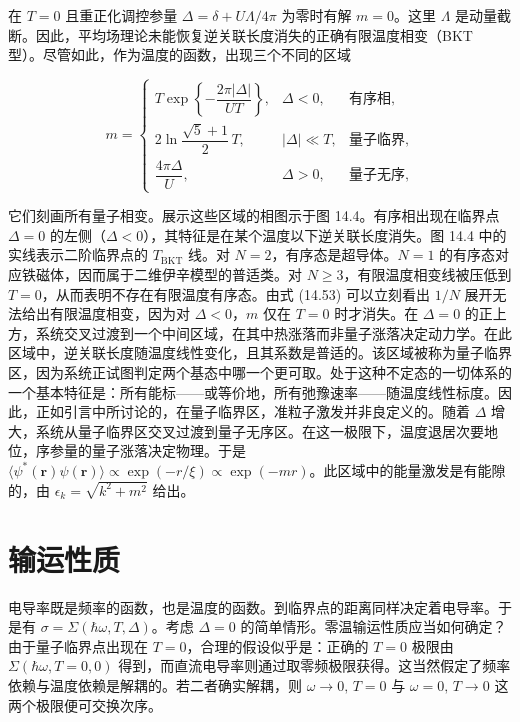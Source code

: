 在 $T=0$ 且重正化调控参量 $\Delta=\delta+U\Lambda/4\pi$ 为零时有解 $m=0$。这里 $\Lambda$ 是动量截断。因此，平均场理论未能恢复逆关联长度消失的正确有限温度相变（BKT 型）。尽管如此，作为温度的函数，出现三个不同的区域

\begin{equation*}
m = \left\{ \begin{array}{lll}
T \exp\left\{ -\dfrac{2\pi|\Delta|}{UT} \right\}, & \Delta<0, & \text{有序相}, \\[2ex]
2\ln\dfrac{\sqrt{5}+1}{2}\, T, & |\Delta|\ll T, & \text{量子临界}, \\[2ex]
\dfrac{4\pi\Delta}{U}, & \Delta>0, & \text{量子无序},
\end{array} \right.\tag{14.53}
\end{equation*}

它们刻画所有量子相变。展示这些区域的相图示于图 14.4。有序相出现在临界点 $\Delta=0$ 的左侧（$\Delta<0$），其特征是在某个温度以下逆关联长度消失。图 14.4 中的实线表示二阶临界点的 $T_{\mathrm{BKT}}$ 线。对 $N=2$，有序态是超导体。$N=1$ 的有序态对应铁磁体，因而属于二维伊辛模型的普适类。对 $N\ge 3$，有限温度相变线被压低到 $T=0$，从而表明不存在有限温度有序态。由式 (14.53) 可以立刻看出 $1/N$ 展开无法给出有限温度相变，因为对 $\Delta<0$，$m$ 仅在 $T=0$ 时才消失。在 $\Delta=0$ 的正上方，系统交叉过渡到一个中间区域，在其中热涨落而非量子涨落决定动力学。在此区域中，逆关联长度随温度线性变化，且其系数是普适的。该区域被称为量子临界区，因为系统正试图判定两个基态中哪一个更可取。处于这种不定态的一切体系的一个基本特征是：所有能标——或等价地，所有弛豫速率——随温度线性标度。因此，正如引言中所讨论的，在量子临界区，准粒子激发并非良定义的。随着 $\Delta$ 增大，系统从量子临界区交叉过渡到量子无序区。在这一极限下，温度退居次要地位，序参量的量子涨落决定物理。于是 $\langle\psi^{*}(\mathbf{r})\psi(\mathbf{r})\rangle\propto\exp(-r/\xi)\propto\exp(-mr)$。此区域中的能量激发是有能隙的，由 $\epsilon_{k}=\sqrt{k^{2}+m^{2}}$ 给出。

\section{输运性质}

电导率既是频率的函数，也是温度的函数。到临界点的距离同样决定着电导率。于是有 $\sigma=\Sigma(\hbar\omega,T,\Delta)$。考虑 $\Delta=0$ 的简单情形。零温输运性质应当如何确定？由于量子临界点出现在 $T=0$，合理的假设似乎是：正确的 $T=0$ 极限由 $\Sigma(\hbar\omega,T=0,0)$ 得到，而直流电导率则通过取零频极限获得。这当然假定了频率依赖与温度依赖是解耦的。若二者确实解耦，则 $\omega\to0,\,T=0$ 与 $\omega=0,\,T\to0$ 这两个极限便可交换次序。

